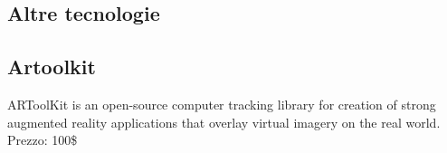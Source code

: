 \documentclass[8pt]{extarticle}
\begin{document}
\begin{multicols}{3}
\section{Altre tecnologie}
\subsection{Artoolkit}
ARToolKit is an open-source computer tracking library for creation of strong augmented reality applications that overlay virtual imagery on the real world.
Prezzo: 100\$








\end{multicols}
\end{document}
